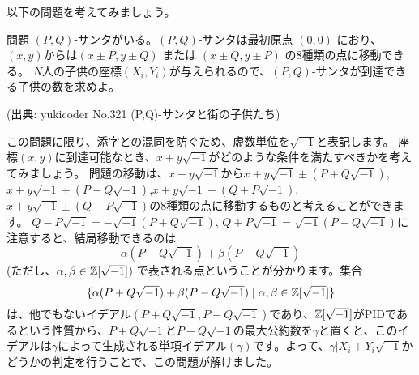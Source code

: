 \documentclass{jsarticle}
\begin{document}
 以下の問題を考えてみましょう。
 \begin{itembox}[l]{問題}
  $(P, Q)$-サンタがいる。$(P, Q)$-サンタは最初原点 $(0, 0)$ におり、$(x, y)$からは$(x \pm P, y \pm Q)$ または $(x \pm Q, y\pm P)$ の8種類の点に移動できる。
  $N$人の子供の座標$(X_i,Y_i)$が与えられるので、$(P, Q)$-サンタが到達できる子供の数を求めよ。

  (出典: yukicoder No.321 (P,Q)-サンタと街の子供たち)
 \end{itembox}
 この問題に限り、添字との混同を防ぐため、虚数単位を$\sqrt{-1}$と表記します。
 座標$(x,y)$に到達可能なとき、$x+y\sqrt{-1}$がどのような条件を満たすべきかを考えてみましょう。
 問題の移動は、$x+y\sqrt{-1}$から$x+y\sqrt{-1}\pm (P+Q\sqrt{-1})$,$x+y\sqrt{-1}\pm (P-Q\sqrt{-1})$,$x+y\sqrt{-1}\pm (Q+P\sqrt{-1})$,$x+y\sqrt{-1}\pm (Q-P\sqrt{-1})$の8種類の点に移動するものと考えることができます。
 $Q-P\sqrt{-1}=-\sqrt{-1}(P+Q\sqrt{-1})$, $Q+P\sqrt{-1}=\sqrt{-1}(P-Q\sqrt{-1})$に注意すると、結局移動できるのは
 \begin{displaymath}
  \alpha(P+Q\sqrt{-1}) + \beta(P-Q\sqrt{-1})
 \end{displaymath}
 (ただし、$\alpha,\beta \in \mathbb{Z}[\sqrt{-1}]$) で表される点ということが分かります。集合
 \begin{displaymath}
  \{\alpha(P+Q\sqrt{-1}) + \beta(P-Q\sqrt{-1}) \mid \alpha,\beta \in \mathbb{Z}[\sqrt{-1}]\}
 \end{displaymath}
 は、他でもないイデアル$(P+Q\sqrt{-1},P-Q\sqrt{-1})$であり、$\mathbb{Z}[\sqrt{-1}]$がPIDであるという性質から、$P+Q\sqrt{-1}$と$P-Q\sqrt{-1}$の最大公約数を$\gamma$と置くと、このイデアルは$\gamma$によって生成される単項イデアル$(\gamma)$です。よって、$\gamma | X_i+Y_i\sqrt{-1}$かどうかの判定を行うことで、この問題が解けました。
\end{document}
